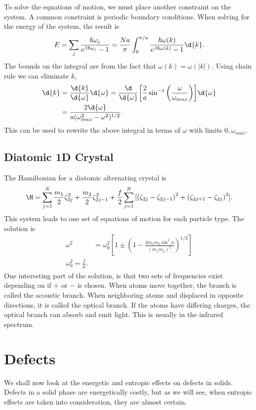 To solve the equations of motion, we must place another constraint on the
system. A common constraint is periodic boundary conditions. When solving for
the energy of the system, the result is
 \begin{equation*}
	 E = \sum_{j}{\frac{\hbar \omega_j}{e^{\beta \hbar \omega_{j}} -1}} = 
	 \frac{Na}{\pi} \int_{0}^{\pi / a}{\frac{\hbar \omega(k)}{e^{\beta \hbar
	 \omega(k)} -1} \d{k}}.
\end{equation*}
The bounds on the integral are from the fact that $\omega(k) = \omega(|k|)$.
Using chain rule we can eliminate $k$,
\begin{align*}
	\d{k} &= \frac{\d{k}}{\d{\omega}} \d{\omega} = \frac{\d}{\d{\omega}}{\left[
		\frac{2}{a}\sin^{-1}{\left(\frac{\omega}{\omega_{max}}\right)}\right]}
		\d{\omega}\\
		&= \frac{2 \d{\omega}}{a(\omega^2_{max} - \omega^2 )^{1 /2}}.
\end{align*}
This can be used to rewrite the above integral in terms of $\omega$ with limits
$0, \omega_{max}$.

\subsection{Diatomic 1D Crystal}
The Hamiltonian for a diatomic alternating crystal is
\begin{equation*}
	\H = \sum_{j=1}^{N}{\frac{m_1}{2}\zeta^2_{2j} + \frac{m_2}{2}\zeta^2_{2j-1}}
	+ \frac{f}{2} \sum_{j=1}^{N}{{[ {(\zeta_{2j} - \zeta_{2j-1})}^2 +
	{(\zeta_{2j+1} - \zeta_{2j})}^2 ]}}.
\end{equation*}
This system leads to one set of equations of motion for each particle type. The
solution is
\begin{align*}
	\omega^2 &= \omega^2_0 {\left[ 1 \pm {\left(1 - \frac{4m_1 m_2
	\sin^2{\phi}}{{(m_1 m_2 )}^2}\right)}^{1 / 2}\right]}\\
	\omega^2_0 = \frac{f}{\mu}.
\end{align*}
One interesting part of the solution, is that two sets of frequencies exist
depending on if $+$ or $-$ is chosen. When atoms move together, the branch is
called the acoustic branch. When neighboring atoms and displaced in opposite
directions, it is called the optical branch. If the atoms have differing
charges, the optical branch can absorb and emit light. This is usually in the
infrared spectrum.

\section{Defects}%
\label{sec:crystal_defects}
We shall now look at the energetic and entropic effects on defects in solids.
Defects in a solid phase are energetically costly, but as we will see, when
entropic effects are taken into consideration, they are almost certain.

